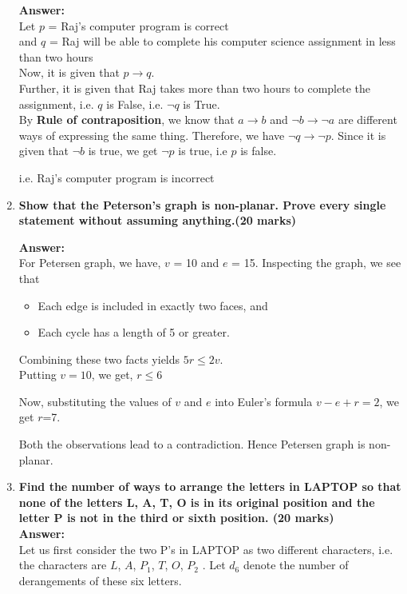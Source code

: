 \documentclass[a4paper]{article}
\begin{document}
\begin{enumerate}
    \textbf{Answer:}\\
    Let $p$ = Raj's computer program is correct\\
    and $q$ = Raj will be able to complete his computer science assignment in less than two hours\\
     
    Now, it is given that $p \rightarrow q$.\\
    Further, it is given that Raj takes more than two hours to complete the assignment, i.e. $q$ is False, i.e. $\neg q$ is True. \\
   
    By \textbf{Rule of contraposition}, we know that $a \rightarrow b$ and $\neg b \rightarrow \neg a$ are different ways of expressing the same thing. Therefore, we have $\neg q \rightarrow \neg p$. Since it is given that $\neg b$ is true, we get $\neg p$ is true, i.e $p$ is false.
    
    i.e. Raj's computer program is incorrect
    
    \item \textbf{Show that the Peterson's graph is non-planar. Prove every single statement without assuming anything.(20 marks)\\}

    \textbf{Answer:}\\
     For Petersen graph, we have, $v$ = 10 and $e$ = 15. Inspecting the graph, we see that 

\begin{itemize}
\item Each edge is included in exactly two faces, and 
\item Each cycle has a length of 5 or greater. 
\end{itemize}
Combining these two facts yields $5r\le2v$.\\
Putting $v=10$, we get, $r\le6$

Now, substituting the values of $v$ and $e$ into Euler's formula $v-e+r=2$, we get $r$=7. 

Both the observations lead to a contradiction. Hence Petersen graph is non-planar.

    \item \textbf{Find the number of ways to arrange the letters in LAPTOP so that none of the letters L, A, T, O is in its original position and the letter P is not in the third or sixth position. (20 marks)}\\
  
    \textbf{Answer:}\\
    Let us first consider the two P's in LAPTOP as two different characters, i.e. the characters are $L$, $A$, $P_1$, $T$, $O$, $P_2$ . Let $d_6$ denote the number of derangements of these six letters.


\end{enumerate}
\end{document}
